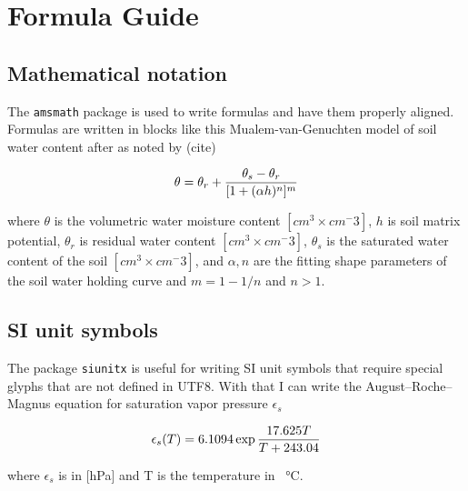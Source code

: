 \section{Formula Guide}
\subsection{Mathematical notation}
The \verb|amsmath| package is used to write formulas and have them properly aligned. Formulas are written in blocks like this Mualem-van-Genuchten model of soil water content after as noted by (cite)

\begin{equation}
\vspace{1cm}
\theta = \theta_r + \frac{\theta_s - \theta_r}{[1+(\alpha h)^n]^m}
\end{equation}

where $\theta$ is the volumetric water moisture content $[cm^3 \times cm^−3]$, $h$ is soil matrix potential, $\theta_r$ is residual water content $[cm^3 \times cm^−3]$, $\theta_s$ is the saturated water content of the soil $[cm^3 \times cm^−3]$, and $\alpha, n$ are the fitting shape parameters of the soil water holding curve and $m=1-1/n$ and $n>1$.

\subsection{SI unit symbols}
\noindent The package \verb|siunitx| is useful for writing SI unit symbols that require special glyphs that are not defined in UTF8.
With that I can write the August–Roche–Magnus equation for saturation vapor pressure $\epsilon_s$

\begin{equation}
    \vspace{1cm}
    \epsilon_s(T) = 6.1094 \exp{\frac{17.625T}{T+243.04}}
\end{equation}

where $\epsilon_s$ is in [hPa] and T is the temperature in \SI{}{\degreeCelsius}.
